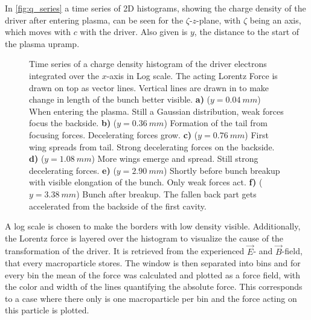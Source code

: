 \documentclass[bachelor_thesis]{subfiles}
\begin{document}
In \autoref{fig:q_series} a time series of 2D histograms, showing the charge density of the driver after entering plasma, can be seen for the $\zeta$-$z$-plane, with $\zeta$ being an axis, which moves with $c$ with the driver. Also given is $y$, the distance to the start of the plasma upramp.
\begin{figure}
	\centering
	
	\caption{Time series of a charge density histogram of the driver electrons integrated over the $x$-axis in Log scale. The acting Lorentz Force is drawn on top as vector lines. Vertical lines are drawn in to make change in length of the bunch better visible. 
	\textbf{a)} ($y=\qty{0.04}{mm}$) When entering the plasma. Still a Gaussian distribution, weak forces focus the backside.
	\textbf{b)} ($y=\qty{0.36}{mm}$) Formation of the tail from focusing forces. Decelerating forces grow.
	\textbf{c)} ($y=\qty{0.76}{mm}$) First wing spreads from tail. Strong decelerating forces on the backside.
	\textbf{d)} ($y=\qty{1.08}{mm}$) More wings emerge and spread. Still strong decelerating forces.
	\textbf{e)} ($y=\qty{2.90}{mm}$) Shortly before bunch breakup with visible elongation of the bunch. Only weak forces act.
	\textbf{f)} ($y=\qty{3.38}{mm}$) Bunch after breakup. The fallen back part gets accelerated from the backside of the first cavity.}
	\label{fig:q_series}
\end{figure}
A log scale is chosen to make the borders with low density visible. Additionally, the Lorentz force is layered over the histogram to visualize the cause of the transformation of the driver. It is retrieved from the experienced $\vec{E}$- and $\vec{B}$-field, that every macroparticle stores.
The window is then separated into bins and for every bin the mean of the force was calculated and plotted as a force field, with the color and width of the lines quantifying the absolute force. 
This corresponds to a case where there only is one macroparticle per bin and the force acting on this particle is plotted.
\end{document}
